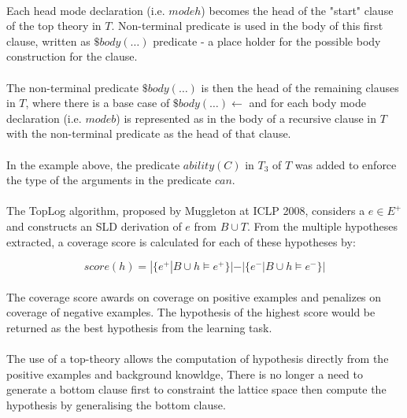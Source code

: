 \documentclass{article}
\theoremstyle{plain}
\theoremstyle{definition}
\begin{document}
\begin{multicols}{2}
\paragraph{} Each head mode declaration (i.e. $modeh$) becomes the head of the "start" clause of the top theory in $T$. Non-terminal predicate is used in the body of this first clause, written as $\$body(\dots)$ predicate - a place holder for the possible body construction for the clause.

\paragraph{} The non-terminal predicate $\$body(\dots)$ is then the head of the remaining clauses in $T$, where there is a base case of $\$body(\dots) \leftarrow$ and for each body mode declaration (i.e. $modeb$) is represented as in the body of a recursive clause in $T$ with the non-terminal predicate as the head of that clause.

\paragraph{} In the example above, the predicate $ability(C)$ in $T_3$ of $T$ was added to enforce the type of the arguments in the predicate $can$.

\paragraph{} The TopLog algorithm, proposed by Muggleton at ICLP 2008, considers a $e \in E^+$ and constructs an SLD derivation of $e$ from $B \cup T$. From the multiple hypotheses extracted, a coverage score is calculated for each of these hypotheses by:

$$score(h) = |\{e^+  | B \cup h \models e^+\}| - |\{e^- | B \cup h \models e^-\}|$$

\paragraph{} The coverage score awards on coverage on positive examples and penalizes on coverage of negative examples. The hypothesis of the highest score would be returned as the best hypothesis from the learning task.

\paragraph{} The use of a top-theory allows the computation of hypothesis directly from the positive examples and background knowldge, There is no longer a need to generate a bottom clause first to constraint the lattice space then compute the hypothesis by generalising the bottom clause.


\end{multicols}
\end{document}
